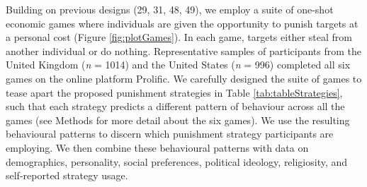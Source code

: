 \documentclass[
  man, donotrepeattitle,floatsintext]{apa6}
\begin{document}
Building on previous designs (29, 31, 48, 49), we employ a suite of one-shot economic games where individuals
are given the opportunity to punish targets at a personal cost (Figure
\ref{fig:plotGames}). In each game, targets either steal from another
individual or do nothing. Representative samples of participants from the United
Kingdom (\emph{n} = 1014) and the
United States (\emph{n} = 996)
completed all six games on the online platform Prolific. We carefully designed
the suite of games to tease apart the proposed punishment strategies in Table
\ref{tab:tableStrategies}, such that each strategy predicts a different pattern
of behaviour across all the games (see Methods for more detail about the six
games). We use the resulting behavioural patterns to discern which punishment
strategy participants are employing. We then combine these behavioural patterns
with data on demographics, personality, social preferences, political ideology,
religiosity, and self-reported strategy usage.
\end{document}

